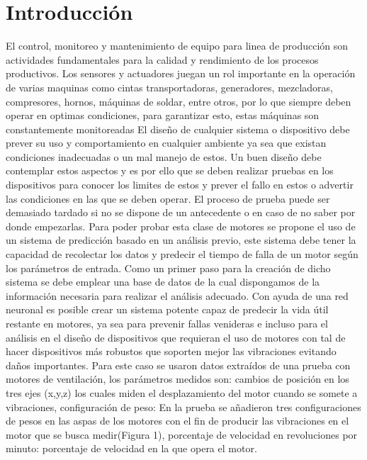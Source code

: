 \documentclass[11pt,a4paper]{article}
\begin{document}
\section{Introducción}
El control, monitoreo y mantenimiento  de equipo para linea de producción son actividades fundamentales para la calidad y rendimiento de los procesos productivos. Los sensores y actuadores juegan un rol importante en la operación de varias maquinas como cintas transportadoras, generadores, mezcladoras, compresores, hornos, máquinas de soldar, entre otros, por lo que siempre deben operar en optimas condiciones, para garantizar esto, estas máquinas son constantemente monitoreadas \cite{accel_cite}
El diseño de cualquier sistema o dispositivo debe prever su uso y comportamiento en cualquier ambiente ya sea que existan condiciones inadecuadas o un mal manejo de estos. Un buen diseño debe contemplar estos aspectos y es por ello que se deben realizar pruebas en los dispositivos para conocer los limites de estos y prever el fallo en estos o advertir las condiciones en las que se deben operar. El proceso de prueba puede ser demasiado tardado si no se dispone de un antecedente o en caso de no saber por donde empezarlas. Para poder probar esta clase de motores se propone el uso de un sistema de predicción basado en un análisis previo, este sistema debe tener la capacidad de recolectar los datos y predecir el tiempo de falla de un motor según los parámetros de entrada. Como un primer paso para la creación de dicho sistema se debe emplear una base de datos de la cual dispongamos de la información necesaria para realizar el análisis adecuado. Con ayuda de una red neuronal es posible crear un sistema potente capaz de predecir la vida útil restante en motores, ya sea para prevenir fallas venideras e incluso para el análisis en el diseño de dispositivos que requieran el uso de motores con tal de hacer dispositivos más robustos que soporten mejor las vibraciones evitando daños importantes. Para este caso se usaron datos extraídos de una prueba con motores de ventilación, los parámetros medidos son: cambios de posición en los tres ejes (x,y,z) los cuales miden el desplazamiento del motor cuando se somete a vibraciones, configuración de peso: En la prueba se añadieron tres configuraciones de pesos en las aspas de los motores con el fin de producir las vibraciones en el motor que se busca medir(Figura 1), porcentaje de velocidad en revoluciones por minuto: porcentaje de velocidad en la que opera el motor.
\end{document}
